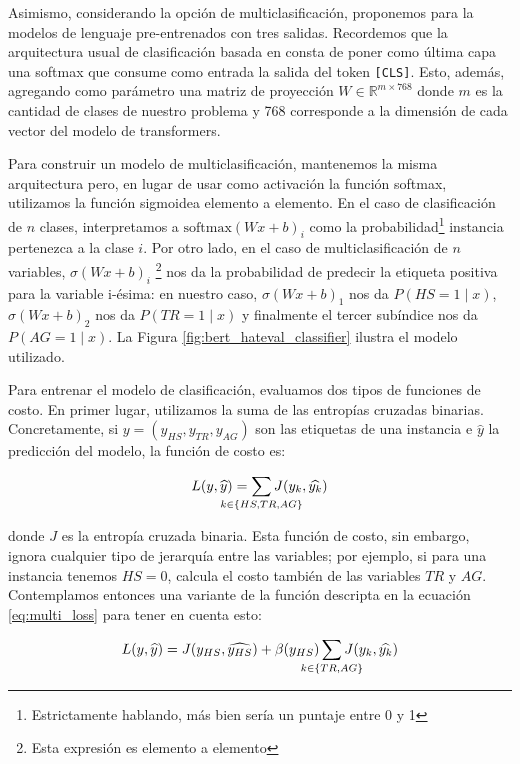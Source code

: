 Asimismo, considerando la opción de multiclasificación, proponemos para la \subtaskb{} modelos de lenguaje pre-entrenados con tres salidas. Recordemos que la arquitectura usual de clasificación basada en \bert{} consta de poner como última capa una softmax que consume como entrada la salida del token \verb|[CLS]|. Esto, además, agregando como parámetro una matriz de proyección $W \in \mathbb{R}^{m \times 768}$ donde $m$ es la cantidad de clases de nuestro problema y 768 corresponde a la dimensión de cada vector del modelo de transformers.

Para construir un modelo de multiclasificación, mantenemos la misma arquitectura pero, en lugar de usar como activación la función softmax, utilizamos la función sigmoidea elemento a elemento. En el caso de clasificación de $n$ clases, interpretamos a $\text{softmax}(W x + b)_i$ como la probabilidad\footnote{Estrictamente hablando, más bien sería un puntaje entre 0 y 1} instancia pertenezca a la clase $i$. Por otro lado, en el caso de multiclasificación de $n$ variables, $\sigma(W x + b)_i$ \footnote{Esta expresión es elemento a elemento} nos da la probabilidad de predecir la etiqueta positiva para la variable i-ésima: en nuestro caso, $\sigma(W x + b)_1$ nos da $P(HS = 1\mid x)$,  $\sigma(W x + b)_2$ nos da  $P(TR = 1 \mid x)$ y finalmente el tercer subíndice nos da  $P(AG = 1\mid x)$. La Figura \ref{fig:bert_hateval_classifier} ilustra el modelo utilizado.

Para entrenar el modelo de clasificación, evaluamos dos tipos de funciones de costo. En primer lugar, utilizamos la suma de las entropías cruzadas binarias. Concretamente, si $y = (y_{HS}, y_{TR}, y_{AG})$ son las etiquetas de una instancia e $\widehat{y}$ la predicción del modelo, la función de costo es:

\begin{equation}
\label{eq:multi_loss}
L(y, \widehat{y}) = \sum\limits_{\mathclap{k \in \{HS, TR, AG\}}} J(y_k, \widehat{y_k})
\end{equation}

\noindent donde $J$ es la entropía cruzada binaria. Esta función de costo, sin embargo, ignora cualquier tipo de jerarquía entre las variables; por ejemplo, si para una instancia tenemos $HS = 0$, calcula el costo también de las variables $TR$ y $AG$. Contemplamos entonces una variante de la función descripta en la ecuación \ref{eq:multi_loss} para tener en cuenta esto:

\begin{equation}
    \label{eq:hierarchical_loss}
    L(y, \widehat{y}) =  J(y_{HS}, \widehat{y_{HS}}) + \beta(y_{HS})\sum\limits_{\mathclap{k \in \{TR, AG\}}} J(y_k, \widehat{y_k})
\end{equation}

